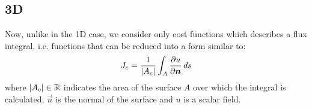 




\subsection{3D}
\label{subsec:adjoint_method_RBF-FD_3D}

Now, unlike in the 1D case, we consider only cost functions which describes a flux integral, i.e. functions that can be reduced into a form similar to:
\begin{equation}
	\label{eqn:continuous_3D_cost_function}
	J_c = \frac{1}{\lvert A_c\rvert} \int_A \frac{\partial u}{\partial \boldsymbol{n}} \, ds
\end{equation}
where $\lvert A_c\rvert \in \mathbb{R}$ indicates the area of the surface $A$ over which the integral is calculated, $\vec{n}$ is the normal of the surface and $u$ is a scalar field.

